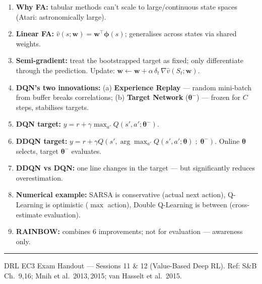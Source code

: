 \documentclass[11pt,a4paper]{article}
\begin{document}
\begin{tcolorbox}[exam={Must Know — Value-Based Deep RL}]
\begin{enumerate}
  \item \textbf{Why FA:} tabular methods can't scale to large/continuous state spaces (Atari: astronomically large).
  \item \textbf{Linear FA:} $\hat{v}(s;\mathbf{w}) = \mathbf{w}^\top\boldsymbol{\phi}(s)$; generalises across states via shared weights.
  \item \textbf{Semi-gradient:} treat the bootstrapped target as fixed; only differentiate through the prediction.
    Update: $\mathbf{w} \leftarrow \mathbf{w} + \alpha\,\delta_t\,\nabla\hat{v}(S_t;\mathbf{w})$.
  \item \textbf{DQN's two innovations:} (a) \textbf{Experience Replay} — random mini-batch from buffer breaks
    correlations; (b) \textbf{Target Network} ($\boldsymbol{\theta}^{-}$) — frozen for $C$ steps, stabilises targets.
  \item \textbf{DQN target:} $y = r + \gamma\max_{a'} Q(s',a';\boldsymbol{\theta}^{-})$.
  \item \textbf{DDQN target:} $y = r + \gamma Q(s', \arg\max_{a'} Q(s',a';\boldsymbol{\theta})\;;\;\boldsymbol{\theta}^{-})$.
    Online $\boldsymbol{\theta}$ selects, target $\boldsymbol{\theta}^{-}$ evaluates.
  \item \textbf{DDQN vs DQN:} one line changes in the target — but significantly reduces overestimation.
  \item \textbf{Numerical example:} SARSA is conservative (actual next action), Q-Learning is optimistic
    ($\max$ action), Double Q-Learning is between (cross-estimate evaluation).
  \item \textbf{RAINBOW:} combines 6 improvements; not for evaluation — awareness only.
\end{enumerate}
\end{tcolorbox}

\vspace{4pt}
\hrule
\vspace{3pt}
{\footnotesize DRL EC3 Exam Handout — Sessions 11 \& 12 (Value-Based Deep RL). Ref: S\&B Ch.~9,16; Mnih et al.\ 2013,\,2015; van Hasselt et al.\ 2015.}
\end{document}
